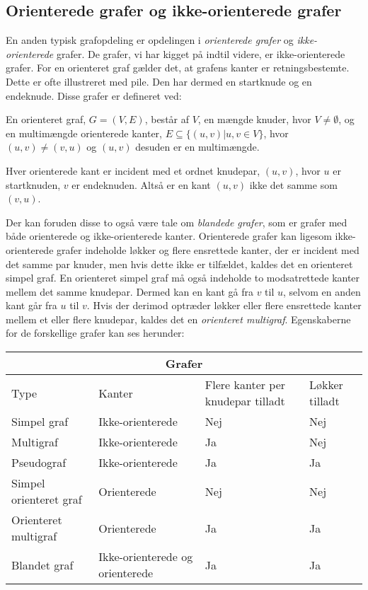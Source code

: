 


\subsection{Orienterede grafer og ikke-orienterede grafer}
En anden typisk grafopdeling er opdelingen i \emph{orienterede grafer} og \emph{ikke-orienterede} grafer. De grafer, vi har kigget på indtil videre, er ikke-orienterede grafer. For en orienteret graf gælder det, at grafens kanter er retningsbestemte. Dette er ofte illustreret med pile. Den har dermed en startknude og en endeknude. Disse grafer er defineret ved:

\begin{defn}  
En orienteret graf, $G=(V,E)$, består af $V$, en mængde knuder, hvor $V \neq \emptyset$, og en multimængde orienterede kanter, $E \subseteq \{(u,v)|u,v \in V\}$, hvor $(u,v) \neq (v,u)$ og $(u,v)$ desuden er en multimængde. 
\end{defn}

Hver orienterede kant er incident med et ordnet knudepar, $(u,v)$, hvor $u$ er startknuden, $v$ er endeknuden. Altså er en kant $(u,v)$ ikke det samme som $(v,u)$.



Der kan foruden disse to også være tale om \emph{blandede grafer}, som er grafer med både orienterede og ikke-orienterede kanter. Orienterede grafer kan ligesom ikke-orienterede grafer indeholde løkker og flere ensrettede kanter, der er incident med det samme par knuder, men hvis dette ikke er tilfældet, kaldes det en orienteret simpel graf. En orienteret simpel graf må også indeholde to modsatrettede kanter mellem det samme knudepar. Dermed kan en kant gå fra $v$ til $u$, selvom en anden kant går fra $u$ til $v$. Hvis der derimod optræder løkker eller flere ensrettede kanter mellem et eller flere knudepar, kaldes det en \emph{orienteret multigraf}.  
Egenskaberne for de forskellige grafer kan ses herunder:


\begin{center} \label{tab:typer}
\begin{tabular}{ |p{4cm}|p{3cm}|p{3cm}|p{2cm}|  }
 \hline
 \multicolumn{4}{|c|}{Grafer} \\
 \hline
 Type & Kanter & Flere kanter per knudepar tilladt & Løkker tilladt\\
 \hline
 Simpel graf   & Ikke-orienterede    & Nej &   Nej\\
 Multigraf &   Ikke-orienterede & Ja   & Nej\\
 Pseudograf & Ikke-orienterede & Ja &  Ja\\
 Simpel orienteret graf    & Orienterede & Nej &  Nej\\
 Orienteret multigraf &  Orienterede  & Ja & Ja\\
 Blandet graf & Ikke-orienterede og orienterede  & Ja   & Ja\\
 \hline
\end{tabular}
\end{center}

